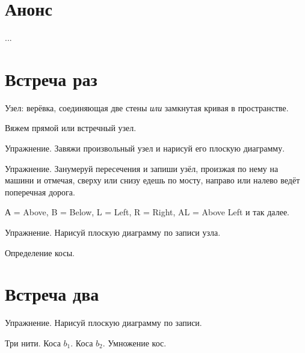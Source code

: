 \documentclass[12pt]{article}
\theoremstyle{definition}
\begin{document}
\tableofcontents{}

\section*{Анонс}
...

\newpage
\setcounter{section}{0}

\section{Встреча раз}


Узел: верёвка, соединяющая две стены \textit{или} замкнутая кривая в пространстве. 

Вяжем прямой или встречный узел. 

Упражнение. Завяжи произвольный узел и нарисуй его плоскую диаграмму. 

Упражнение. Занумеруй пересечения и запиши узёл, произжая по нему на машини и отмечая, 
сверху или снизу едешь по мосту, направо или налево ведёт поперечная дорога. 

А = Above, B = Below, L = Left, R = Right, AL = Above Left и так далее.

Упражнение. Нарисуй плоскую диаграмму по записи узла. 

Определение косы. 

\section{Встреча два}

Упражнение. Нарисуй плоскую диаграмму по записи. 

Три нити. Коса $b_1$. Коса $b_2$. Умножение кос. 
\end{document}
